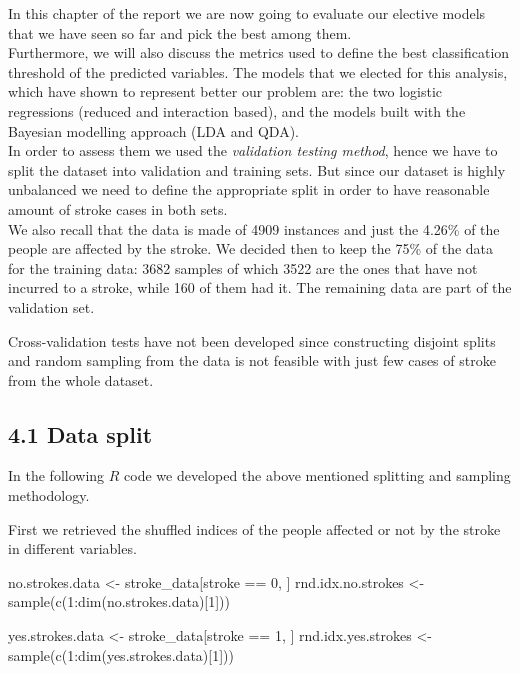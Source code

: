 \documentclass[
]{article}
\newenvironment{Shaded}{\begin{snugshade}}{\end{snugshade}}
\newcommand{\DecValTok}[1]{\textcolor[rgb]{0.00,0.00,0.81}{#1}}
\newcommand{\FunctionTok}[1]{\textcolor[rgb]{0.00,0.00,0.00}{#1}}
\newcommand{\NormalTok}[1]{#1}
\newcommand{\OtherTok}[1]{\textcolor[rgb]{0.56,0.35,0.01}{#1}}
\newcommand{\SpecialCharTok}[1]{\textcolor[rgb]{0.00,0.00,0.00}{#1}}
\begin{document}
In this chapter of the report we are now going to evaluate our elective
models that we have seen so far and pick the best among them.\\
Furthermore, we will also discuss the metrics used to define the best
classification threshold of the predicted variables. The models that we
elected for this analysis, which have shown to represent better our
problem are: the two logistic regressions (reduced and interaction
based), and the models built with the Bayesian modelling approach (LDA
and QDA).\\
In order to assess them we used the \emph{validation testing method},
hence we have to split the dataset into validation and training sets. But since
our dataset is highly unbalanced we need to define the appropriate split
in order to have reasonable amount of stroke cases in both sets.\\
We also recall that the data is made of 4909 instances and just the
4.26\% of the people are affected by the stroke. We decided then to keep
the 75\% of the data for the training data: 3682 samples of which 3522
are the ones that have not incurred to a stroke, while 160 of them had
it. The remaining data are part of the validation set.

Cross-validation tests have not been developed since constructing
disjoint splits and random sampling from the data is not feasible with
just few cases of stroke from the whole dataset.

\hypertarget{data-split}{%
\subsection{4.1 Data split}\label{data-split}}

In the following \(R\) code we developed the above mentioned splitting
and sampling methodology.

First we retrieved the shuffled indices of the people affected or not by
the stroke in different variables.

\begin{Shaded}
\begin{Highlighting}[]
\NormalTok{no.strokes.data }\OtherTok{\textless{}{-}}\NormalTok{ stroke\_data[stroke }\SpecialCharTok{==} \DecValTok{0}\NormalTok{, ]}
\NormalTok{rnd.idx.no.strokes }\OtherTok{\textless{}{-}} \FunctionTok{sample}\NormalTok{(}\FunctionTok{c}\NormalTok{(}\DecValTok{1}\SpecialCharTok{:}\FunctionTok{dim}\NormalTok{(no.strokes.data)[}\DecValTok{1}\NormalTok{]))}

\NormalTok{yes.strokes.data }\OtherTok{\textless{}{-}}\NormalTok{ stroke\_data[stroke }\SpecialCharTok{==} \DecValTok{1}\NormalTok{, ]}
\NormalTok{rnd.idx.yes.strokes }\OtherTok{\textless{}{-}} \FunctionTok{sample}\NormalTok{(}\FunctionTok{c}\NormalTok{(}\DecValTok{1}\SpecialCharTok{:}\FunctionTok{dim}\NormalTok{(yes.strokes.data)[}\DecValTok{1}\NormalTok{]))}
\end{Highlighting}
\end{Shaded}
\end{document}
